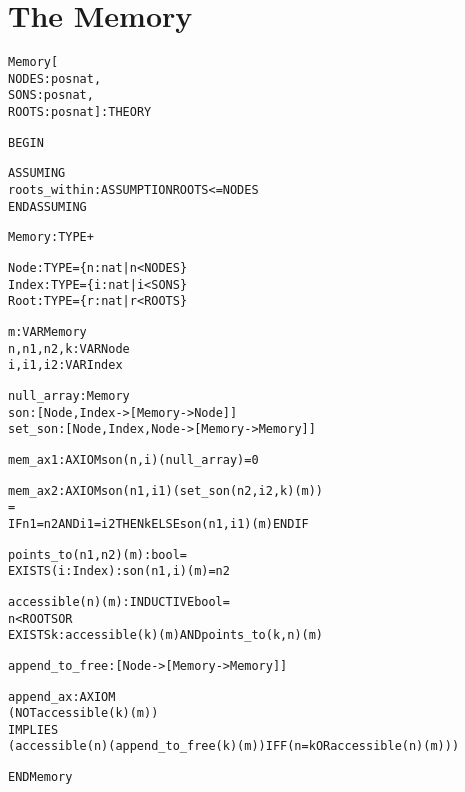 
\newpage
\section{The Memory}
\label{memory-appendix}

\begin{alltt}
%%%%%%%%%%%%%%%%%%%%%%%%%%%%%%%%%%%%%%%%%%%%%%%%%%%%%%%%%%%%%%%
% Memory :                                                    %
%   Defines the memory type and the basic operations upon it. %
%   Defines what it means for a node to be accessible in a    % 
%   memory.                                                   %
%%%%%%%%%%%%%%%%%%%%%%%%%%%%%%%%%%%%%%%%%%%%%%%%%%%%%%%%%%%%%%%

Memory[
  NODES : posnat, 
  SONS  : posnat, 
  ROOTS : posnat] : THEORY

BEGIN

  ASSUMING
    roots_within : ASSUMPTION ROOTS <= NODES
  ENDASSUMING

  Memory : TYPE+

  Node   : TYPE = \{n : nat | n < NODES\}
  Index  : TYPE = \{i : nat | i < SONS\}
  Root   : TYPE = \{r : nat | r < ROOTS\}

  m : VAR Memory
  n,n1,n2,k : VAR Node
  i,i1,i2 : VAR Index

  null_array : Memory
  son        : [Node,Index -> [Memory -> Node]]
  set_son    : [Node,Index,Node -> [Memory -> Memory]]

  mem_ax1 : AXIOM son(n,i)(null_array) = 0

  mem_ax2 : AXIOM son(n1,i1)(set_son(n2,i2,k)(m))
                    =
                  IF n1=n2 AND i1=i2 THEN k ELSE son(n1,i1)(m) ENDIF

  points_to(n1,n2)(m):bool =
    EXISTS (i:Index): son(n1,i)(m)=n2

  accessible(n)(m): INDUCTIVE bool = 
    n < ROOTS OR
    EXISTS k: accessible(k)(m) AND points_to(k,n)(m)

  append_to_free : [Node -> [Memory -> Memory]]

  append_ax: AXIOM
        (NOT accessible(k)(m))
            IMPLIES
          (accessible(n)(append_to_free(k)(m)) IFF (n = k OR accessible(n)(m)))  

END Memory
\end{alltt}


